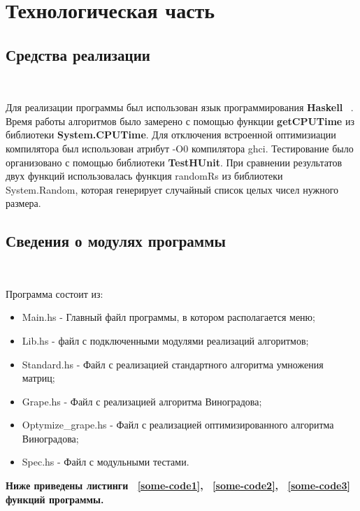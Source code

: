 \documentclass[12pt]{report}
\begin{document}
	\chapter{Технологическая часть}
	
	\section{Средства реализации}
	
	~\
	
	Для реализации программы был использован язык программирования {\bf Haskell} ~\cite{Haskell}.
	Время работы алгоритмов было замерено с помощью функции {\bf getCPUTime} из библиотеки {\bf System.CPUTime}. Для отключения встроенной оптимизиации компилятора был использован атрибут -O0 компилятора ghci.
	Тестирование было организовано с помощью библиотеки  \textbf{TestHUnit}.
	При сравнении результатов двух функций использовалась функция randomRs из библиотеки System.Random, которая генерирует случайный список целых чисел нужного размера.
	
	\section{Сведения о модулях программы}
	
	~\
	
	Программа состоит из:
	\begin{itemize}
		\item Main.hs - Главный файл программы, в котором располагается меню;
		\item Lib.hs - файл с подключенными модулями реализаций алгоритмов;
		\item Standard.hs - Файл с реализацией стандартного алгоритма умножения матриц;
		\item Grape.hs - Файл с реализацией алгоритма Виноградова;
		\item Optymize\_grape.hs - Файл с реализацией оптимизированного алгоритма Виноградова;
		\item Spec.hs - Файл с модульными тестами.
	\end{itemize}
	
	{\bf Ниже приведены листинги  ~\ref{some-code1}, ~\ref{some-code2}, ~\ref{some-code3} функций программы.}
	
\end{document}
